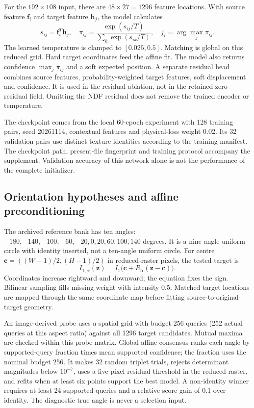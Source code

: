 For the $192\times108$ input, there are $48\times27=1296$ feature locations. With source feature $\mathbf f_i$ and target feature $\mathbf h_j$, the model calculates
\begin{equation}
s_{ij}=\mathbf f_i^T\mathbf h_j,\quad
\pi_{ij}=\frac{\exp(s_{ij}/T)}{\sum_k\exp(s_{ik}/T)},\quad
j_i=\arg\max_j\pi_{ij}.\label{eq:coarse}
\end{equation}
The learned temperature is clamped to $[0.025,0.5]$. Matching is global on this reduced grid. Hard target coordinates feed the affine fit. The model also returns confidence $\max_j\pi_{ij}$ and a soft expected position. A separate residual head combines source features, probability-weighted target features, soft displacement and confidence. It is used in the residual ablation, not in the retained zero-residual field. Omitting the NDF residual does not remove the trained encoder or temperature.

The checkpoint comes from the local 60-epoch experiment with 128 training pairs, seed 20261114, contextual features and physical-loss weight 0.02. Its 32 validation pairs use distinct texture identities according to the training manifest. The checkpoint path, present-file fingerprint and training protocol accompany the supplement. Validation accuracy of this network alone is not the performance of the complete initializer.

\subsection{Orientation hypotheses and affine preconditioning}
The archived reference bank has ten angles: $-180,-140,-100,-60,-20,0,20,60,100,140$ degrees. It is a nine-angle uniform circle with identity inserted, not a ten-angle uniform circle. For centre $\mathbf c=((W-1)/2,(H-1)/2)$ in reduced-raster pixels, the tested target is
\begin{equation}
I_{1,\alpha}(\mathbf z)=I_1\bigl(\mathbf c+R_\alpha(\mathbf z-\mathbf c)\bigr).\label{eq:rotation}
\end{equation}
Coordinates increase rightward and downward; the equation fixes the sign. Bilinear sampling fills missing weight with intensity 0.5. Matched target locations are mapped through the same coordinate map before fitting source-to-original-target geometry.

An image-derived probe uses a spatial grid with budget 256 queries (252 actual queries at this aspect ratio) against all 1296 target candidates. Mutual maxima are checked within this probe matrix. Global affine consensus ranks each angle by supported-query fraction times mean supported confidence; the fraction uses the nominal budget 256. It makes 32 random triplet trials, rejects determinant magnitudes below $10^{-7}$, uses a five-pixel residual threshold in the reduced raster, and refits when at least six points support the best model. A non-identity winner requires at least 24 supported queries and a relative score gain of 0.1 over identity. The diagnostic true angle is never a selection input.

